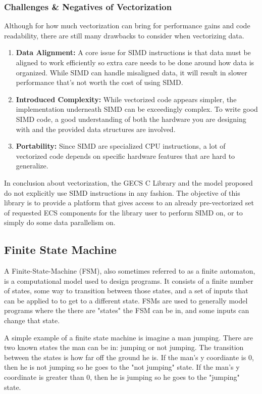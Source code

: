 \subsubsection{Challenges \& Negatives of Vectorization}
Although for how much vectorization can bring for performance gains and code readability, there are still many drawbacks to consider when vectorizing data.
\begin{enumerate}
    \item \textbf{Data Alignment:} A core issue for SIMD instructions is that data must be aligned to work efficiently so extra care needs to be done around how data is organized. While SIMD can handle misaligned data, it will result in slower performance that's not worth the cost of using SIMD.
    \item \textbf{Introduced Complexity:} While vectorized code appears simpler, the implementation underneath SIMD can be exceedingly complex. To write good SIMD code, a good understanding of both the hardware you are designing with and the provided data structures are involved.
    \item \textbf{Portability:} Since SIMD are specialized CPU instructions, a lot of vectorized code depends on specific hardware features that are hard to generalize. 
\end{enumerate}

In conclusion about vectorization, the GECS C Library and the model proposed do not explicitly use SIMD instructions in any fashion. The objective of this library is to provide a platform that gives access to an already pre-vectorized set of requested ECS components for the library user to perform SIMD on, or to simply do some data parallelism on.

\subsection{Finite State Machine}
A Finite-State-Machine (FSM), also sometimes referred to as a finite automaton, is a computational model used to design programs. It consists of a finite number of states, some way to transition between those states, and a set of inputs that can be applied to to get to a different state. FSMs are used to generally model programs where the there are "states" the FSM can be in, and some inputs can change that state. 

A simple example of a finite state machine is imagine a man jumping. There are two known states the man can be in: jumping or not jumping. The transition between the states is how far off the ground he is. If the man's y coordiante is 0, then he is not jumping so he goes to the "not jumping" state. If the man's y coordinate is greater than 0, then he is jumping so he goes to the "jumping" state.

